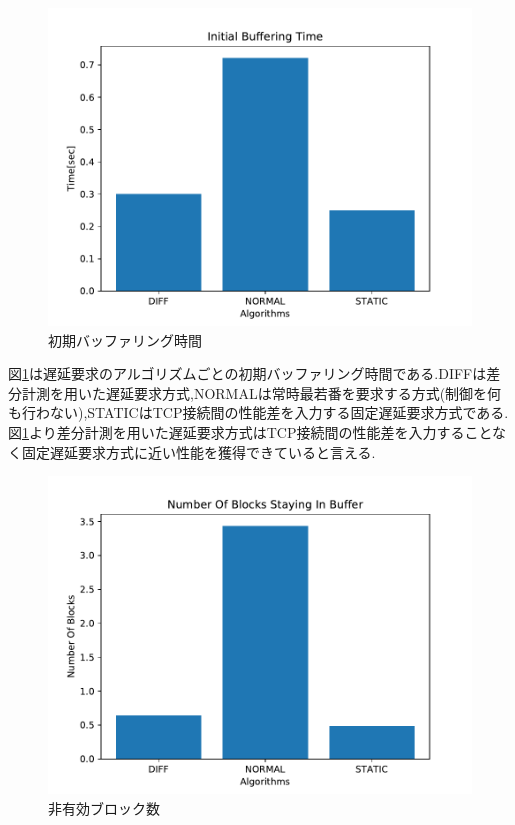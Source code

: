 \documentclass[a4j,12pt]{gradthesis_utf8}
\begin{document}
\begin{figure}[h]
	\begin{center}
		\includegraphics[width=15cm]{InitialBufferingTime.pdf}
		\caption{初期バッファリング時間}
		\label{ibt}
	\end{center}
\end{figure}
図\ref{ibt}は遅延要求のアルゴリズムごとの初期バッファリング時間である.DIFFは差分計測を用いた遅延要求方式,NORMALは常時最若番を要求する方式(制御を何も行わない),STATICはTCP接続間の性能差を入力する固定遅延要求方式である.図\ref{ibt}より差分計測を用いた遅延要求方式はTCP接続間の性能差を入力することなく固定遅延要求方式に近い性能を獲得できていると言える.

\newpage

\begin{figure}[h]
	\begin{center}
		\includegraphics[width=15cm]{NumberOfBlocksStayingInBuffer.pdf}
		\caption{非有効ブロック数}
		\label{nsb}
	\end{center}
\end{figure}
\end{document}
